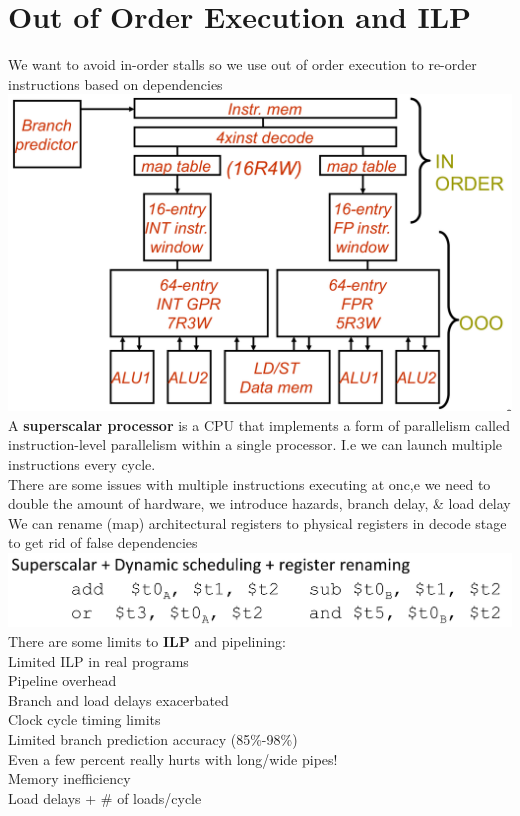 \section{Out of Order Execution and ILP}
We want to avoid in-order stalls so we use out of order execution to re-order instructions based on dependencies\\
\includegraphics[width=\linewidth]{png/ooo.png}
A \textbf{superscalar processor} is a CPU that implements a form of parallelism
called instruction-level parallelism within a single processor. I.e we can launch
multiple instructions every cycle.\\

There are some issues with multiple instructions executing at onc,e we need to
double the amount of hardware, we introduce hazards, branch delay, \& load delay\\

We can rename (map) architectural registers to physical registers in decode stage
to get rid of false dependencies\\

\includegraphics[width=\linewidth]{png/super.png}
There are some limits to \textbf{ILP} and pipelining:\\
Limited ILP in real programs\\
Pipeline overhead\\
Branch and load delays exacerbated\\
Clock cycle timing limits\\
Limited branch prediction accuracy (85\%-98\%)\\
Even a few percent really hurts with long/wide pipes!\\
Memory inefficiency\\
Load delays + \# of loads/cycle\\
